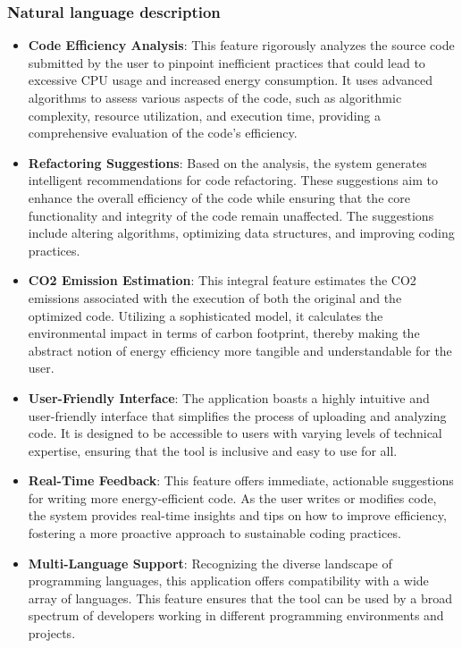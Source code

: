 \documentclass[conference,compsoc]{IEEEtran}
\begin{document}
\subsubsection{Natural language description}
\begin{itemize}
    \item \textbf{Code Efficiency Analysis}: This feature rigorously analyzes the source code submitted by the user to pinpoint inefficient practices that could lead to excessive CPU usage and increased energy consumption. It uses advanced algorithms to assess various aspects of the code, such as algorithmic complexity, resource utilization, and execution time, providing a comprehensive evaluation of the code's efficiency.\item \textbf{Refactoring Suggestions}: Based on the analysis, the system generates intelligent recommendations for code refactoring. These suggestions aim to enhance the overall efficiency of the code while ensuring that the core functionality and integrity of the code remain unaffected. The suggestions include altering algorithms, optimizing data structures, and improving coding practices.

    \item \textbf{CO2 Emission Estimation}: This integral feature estimates the CO2 emissions associated with the execution of both the original and the optimized code. Utilizing a sophisticated model, it calculates the environmental impact in terms of carbon footprint, thereby making the abstract notion of energy efficiency more tangible and understandable for the user.
    
    \item \textbf{User-Friendly Interface}: The application boasts a highly intuitive and user-friendly interface that simplifies the process of uploading and analyzing code. It is designed to be accessible to users with varying levels of technical expertise, ensuring that the tool is inclusive and easy to use for all.
    
    \item \textbf{Real-Time Feedback}: This feature offers immediate, actionable suggestions for writing more energy-efficient code. As the user writes or modifies code, the system provides real-time insights and tips on how to improve efficiency, fostering a more proactive approach to sustainable coding practices.
    
    \item \textbf{Multi-Language Support}: Recognizing the diverse landscape of programming languages, this application offers compatibility with a wide array of languages. This feature ensures that the tool can be used by a broad spectrum of developers working in different programming environments and projects.
    

\end{itemize}
\end{document}
